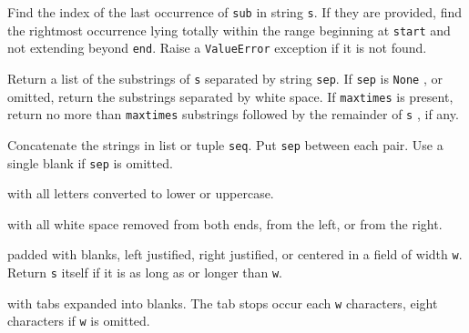 Find the index of the last
occurrence of \texttt{sub} in string \texttt{s}. If they are provided, find
the rightmost occurrence lying totally within the range beginning at
\texttt{start} and not extending beyond \texttt{end}. Raise a
\texttt{ValueError} exception if it is not found.













Return a list of the substrings of
\texttt{s} separated by string \texttt{sep}. If \texttt{sep} is \texttt{None} ,
or omitted, return the substrings separated by white space. If
\texttt{maxtimes} is present, return no more than \texttt{maxtimes}
substrings followed by the remainder of \texttt{s} , if any.







Concatenate the strings in list or
tuple \texttt{seq}. Put \texttt{sep} between each pair. Use a single blank
if \texttt{sep} is omitted.









 with all
letters converted to lower or uppercase.













 with all
white space removed from both ends, from the left, or from the right.













 padded
with blanks, left justified, right justified, or centered in a field of
width \texttt{w}. Return \texttt{s} itself if it is as long as or longer
than \texttt{w}.









 with
tabs expanded into blanks. The tab stops occur each \texttt{w} characters,
eight characters if \texttt{w} is omitted.

